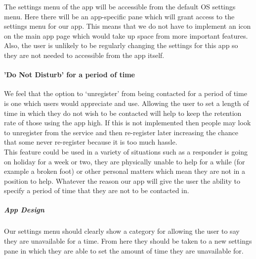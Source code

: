 \documentclass{article}
\begin{document}
The settings menu of the app will be accessible from the default OS settings menu. Here there will be an app-specific pane which will grant access to the settings menu for our app. This means that we do not have to implement an icon on the main app page which would take up space from more important features. Also, the user is unlikely to be regularly changing the settings for this app so they are not needed to accessible from the app itself.

\paragraph{'Do Not Disturb' for a period of time}
We feel that the option to ‘unregister’ from being contacted for a period of time is one which users would appreciate and use. Allowing the user to set a length of time in which they do not wish to be contacted will help to keep the retention rate of those using the app high. If this is not implemented then people may look to unregister from the service and then re-register later increasing the chance that some never re-register because it is too much hassle.\\

This feature could be used in a variety of situations such as a responder is going on holiday for a week or two, they are physically unable to help for a while (for example a broken foot) or other personal matters which mean they are not in a position to help. Whatever the reason our app will give the user the ability to specify a period of time that they are not to be contacted in.

\pagebreak
\subparagraph{App Design}
Our settings menu should clearly show a category for allowing the user to say they are unavailable for a time. From here they should be taken to a new settings pane in which they are able to set the amount of time they are unavailable for. \\
\end{document}
